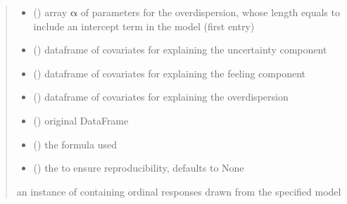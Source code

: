 \documentclass[letterpaper,10pt,english]{sphinxmanual}
\begin{document}
\begin{fulllineitems}
\begin{quote}
\begin{description}
\begin{itemize}
\item {} 
\sphinxAtStartPar
{} () \textendash{} array \(\pmb \alpha\) of parameters for the overdispersion, whose length equals 
 to include an intercept term in the model (first entry)

\item {} 
\sphinxAtStartPar
{} () \textendash{} dataframe of covariates for explaining the uncertainty component

\item {} 
\sphinxAtStartPar
{} () \textendash{} dataframe of covariates for explaining the feeling component

\item {} 
\sphinxAtStartPar
{} () \textendash{} dataframe of covariates for explaining the overdispersion

\item {} 
\sphinxAtStartPar
{} () \textendash{} original DataFrame

\item {} 
\sphinxAtStartPar
{} () \textendash{} the formula used

\item {} 
\sphinxAtStartPar
{} (\sphinxstyleliteralemphasis{\sphinxupquote{, }}) \textendash{} the  to ensure reproducibility, defaults to None

\end{itemize}

\sphinxAtStartPar
an instance of  containing ordinal responses drawn from the specified model

\end{description}\end{quote}

\end{fulllineitems}
\end{document}
